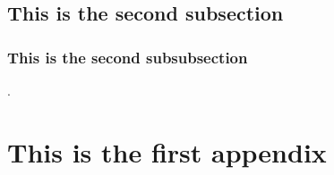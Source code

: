 \documentclass[12pt, a4paper, twoside]{article} %
\begin{document}
	\subsection{This is the second subsection}
	\lipsum
	\subsubsection{This is the second subsubsection}
	\lipsum \cite{lovecraft2016el}. 
	
	\cleardoublepage
	\appendix
	
	\section{This is the first appendix}
	
	\cleardoublepage
	\printbibliography[heading=bibintoc] %
\end{document}
